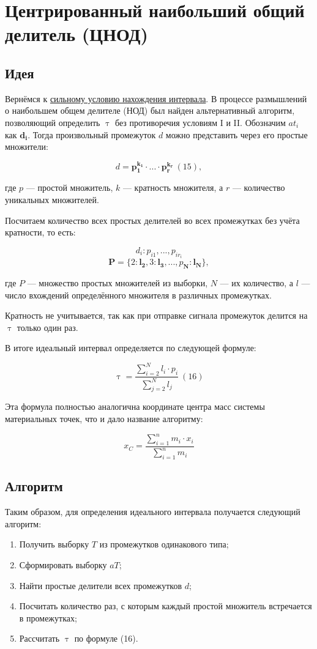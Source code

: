 \documentclass[12pt]{report}
\let\tau\uptau
\begin{document}
\section{Центрированный наибольший общий делитель (ЦНОД)}
\subsection{Идея}

Вернёмся к \hyperref[sec:GCF]{сильному условию нахождения интервала}. В процессе размышлений о наибольшем общем делителе (НОД) был найден альтернативный алгоритм, позволяющий определить $\tau$ без противоречия условиям I и II. Обозначим $a t_i$ как $\bm{d_i}$. Тогда произвольный промежуток $d$ можно представить через его простые множители:

$$d = \bm{p_1^{k_1}} \cdot ... \cdot \bm{p_r^{k_r}}\ (15),$$

где $p$ — простой множитель, $k$ — кратность множителя, а $r$ — количество уникальных множителей.

Посчитаем количество всех простых делителей во всех промежутках без учёта кратности, то есть:

$$d_i: p_{i1}, ..., p_{i r_i}$$
$$\bm{P} = \{2: \bm{l_2}, 3: \bm{l_3}, ...,p_{\bm{N}}: \bm{l_N}\},$$

где $P$ — множество простых множителей из выборки, $N$ — их количество, а $l$ — число вхождений определённого множителя в различных промежутках.

Кратность не учитывается, так как при отправке сигнала промежуток делится на $\tau$ только один раз.

В итоге идеальный интервал определяется по следующей формуле:

$$\tau = \frac{\sum_{i=2}^N l_i \cdot p_i}{\sum_{j=2}^N l_j}\ (16)$$

Эта формула полностью аналогична координате центра масс системы материальных точек, что и дало название алгоритму:

$$x_C = \frac{\sum_{i=1}^n m_i \cdot x_i}{\sum_{i=1}^n m_i}$$

\subsection{\textbf{Алгоритм}}

Таким образом, для определения идеального интервала получается следующий алгоритм:
\begin{enumerate}
    \item Получить выборку $T$ из промежутков одинакового типа;
    \item Сформировать выборку $aT$;
    \item Найти простые делители всех промежутков $d$;
    \item Посчитать количество раз, с которым каждый простой множитель встречается в промежутках;
    \item Рассчитать $\tau$ по формуле (16).
\end{enumerate}
\end{document}
